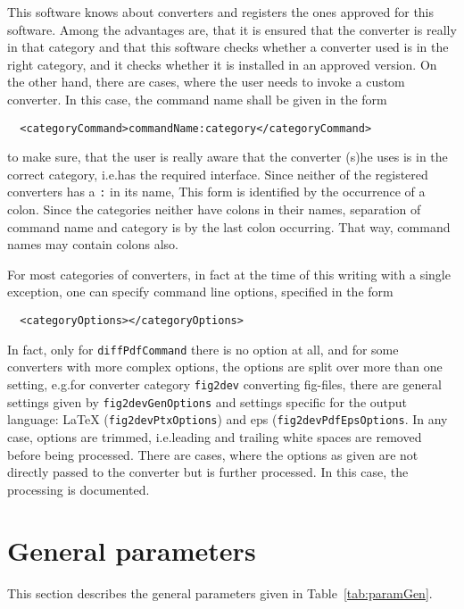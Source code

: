 This software knows about converters and registers the ones approved for this software. 
Among the advantages are, that it is ensured that the converter is really in that category 
and that this software checks whether a converter used is in the right category, 
and it checks whether it is installed in an approved version. 
On the other hand, there are cases, where the user needs to invoke a custom converter. 
In this case, the command name shall be given in the form 
%
\begin{verbatim}
  <categoryCommand>commandName:category</categoryCommand>
\end{verbatim}
%
to make sure, that the user is really aware that the converter (s)he uses %
is in the correct category, i.e.\@ has the required interface. 
Since neither of the registered converters has a \texttt{:} in its name, 
This form is identified by the occurrence of a colon. 
Since the categories neither have colons in their names, 
separation of command name and category is by the last colon occurring. 
That way, command names may contain colons also. 

For most categories of converters, in fact at the time of this writing with a single exception, 
one can specify command line options, specified in the form 
%
\begin{verbatim}
  <categoryOptions></categoryOptions>
\end{verbatim}
%
In fact, only for \texttt{diffPdfCommand} there is no option at all, 
and for some converters with more complex options, the options are split over more than one setting, 
e.g.\@ for converter category \texttt{fig2dev} converting \gls{fig}-files, 
there are general settings given by \texttt{fig2devGenOptions}
and settings specific for the output language: 
\LaTeX{} (\texttt{fig2devPtxOptions}) and \gls{eps} (\texttt{fig2devPdfEpsOptions}. 
In any case, options are trimmed, i.e.\@ leading and trailing white spaces are removed 
before being processed. 
There are cases, where the options as given are not directly passed to the converter 
but is further processed. 
In this case, the processing is documented. 





\section{General parameters }\label{sec:settingsGen}

This section describes the general parameters given in Table~\ref{tab:paramGen}. 


